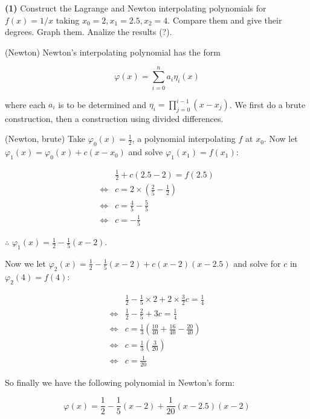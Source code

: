 \documentclass[12pt]{article}
\theoremstyle{definition}
\begin{document}
\begin{shaded}
    \textbf{(1)} Construct the Lagrange and Newton interpolating polynomials 
    for $f(x) = 1 / x$ taking $x_0 = 2, x_1 = 2.5, x_2 = 4$. Compare them and
    give their degrees. Graph them. Analize the results (?).
\end{shaded}

(Newton) Newton's interpolating polynomial has the form 

\begin{equation*}
    \varphi(x) = \sum_{i=0}^n a_i \eta_i(x)
\end{equation*}

where each $a_i$ is to be determined and $\eta_i = \prod_{j=0}^{i-1} (x-x_j)$.
We first do a brute construction, then a construction using divided differences.

(Newton, brute) Take $\varphi_0(x) = \frac{1}{2}$, a polynomial interpolating $f$ at $x_0$. Now
let $\varphi_1(x) = \varphi_0(x) + c(x-x_0)$ and solve $\varphi_1(x_1) =
f(x_1)$:

\begin{align*}
    &\frac{1}{2} + c(2.5 - 2) = f(2.5)\\ 
    \iff&c = 2\times \left( \frac{2}{5} - \frac{1}{2} \right) \\ 
    \iff&c = \frac{4}{5} - \frac{5}{5} \\ 
    \iff&c = -\frac{1}{5}
\end{align*}

$\therefore $ $\varphi_1(x) = \frac{1}{2} - \frac{1}{5}(x - 2)$.


Now we let $\varphi_2(x) = \frac{1}{2} - \frac{1}{5}(x-2) + c(x-2)(x - 2.5)$ and solve
for $c$ in $\varphi_2(4) = f(4)$:

\begin{align*}
    &\frac{1}{2} - \frac{1}{5}\times 2 + 2\times \frac{3}{2}c = \frac{1}{4} \\ 
    \iff&\frac{1}{2} - \frac{2}{5} + 3c = \frac{1}{4} \\ 
    \iff&c = \frac{1}{3}\left(\frac{10}{40} +  \frac{16}{40} - \frac{20}{40} \right) \\ 
    \iff& c = \frac{1}{3}\left( \frac{3}{20} \right) \\ 
    \iff&c=\frac{1}{20}
\end{align*}

So finally we have the following polynomial in Newton's form:

\begin{equation*}
    \varphi(x) = \frac{1}{2} - \frac{1}{5}(x-2) + \frac{1}{20}(x-2.5)(x-2)
\end{equation*}
\end{document}
